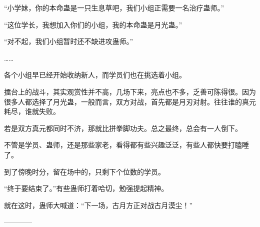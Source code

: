 \begin{this_body}
“小学妹，你的本命蛊是一只生息草吧，我们小组正需要一名治疗蛊师。”

“这位学长，我想加入你们的小组，我的本命蛊是月光蛊。”

“对不起，我们小组暂时还不缺进攻蛊师。”

……

各个小组早已经开始收纳新人，而学员们也在挑选着小组。

擂台上的战斗，其实观赏性并不高，几场下来，亮点也不多，乏善可陈得很。因为很多人都选择了月光蛊，一般而言，双方对战，首先都是月刃对射。往往谁的真元耗尽，谁就失败。

若是双方真元都同时不济，那就比拼拳脚功夫。总之最终，总会有一人倒下。

不管是学员、蛊师，还是那些家老，看得都有些兴趣泛泛，有些人都快要打瞌睡了。

到了傍晚时分，留在场中的，只剩下个位数的学员。

“终于要结束了。”有些蛊师打着哈切，勉强提起精神。

就在这时，蛊师大喊道：“下一场，古月方正对战古月漠尘！”

------------

\end{this_body}

